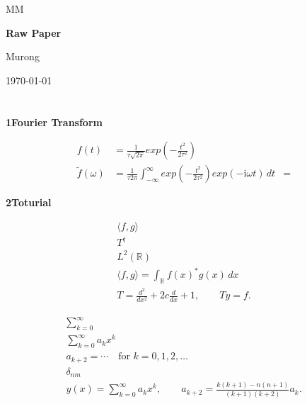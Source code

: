 \documentclass[12pt]{article}
\newcommand{\studentname}{Murong}
\newcommand{\coursename}{MM}
\newcommand{\sheetnumber}{Raw Paper}
\newcommand{\assignmenttitle}{}
\newcommand{\submissiondate}{\today}
\newcommand{\problem}[2]{%
    \par\vspace{1em}
    \noindent\textbf{#1\quad #2}
    \par\smallskip
}
\begin{document}
\begin{titlepage}
    \centering

    {\large \coursename\par}

    \vfill

    {\LARGE\bfseries \sheetnumber\par}

    \vspace{1cm}

    {\large \assignmenttitle\par}

    \vspace{1cm}

    {\large \studentname\par}

    \vspace{0.5cm}

    {\large \submissiondate\par}

    \vfill
\end{titlepage}

\pagebreak

\section*{\assignmenttitle}

\problem{1}{Fourier Transform}
\begin{align}
    f(t) &= \frac{1}{\tau \sqrt{2 \pi}} exp\left(-\frac{t^2}{2 \tau^2}\right) \\
    \tilde{f}(\omega) &= \frac{1}{\tau 2 \pi} \int_{-\infty}^{\infty} exp \left(-\frac{t^2}{2 \tau^2}\right) exp(-\mathrm{i} \omega t)\, dt
    &= 
\end{align}

\problem{2}{Toturial}
\begin{equation}
    \begin{gathered}
      \langle f,g\rangle \\
      T^\dagger \\
      L^2(\mathbb{R}) \\
      \langle f,g  \rangle = \int_{\mathbb{R}} f(x)^*g(x)\,dx \\
      T = \frac{d^2}{dx^2} + 2c\frac{d}{dx} + 1, \qquad Ty=f.
    \end{gathered}
\end{equation}

\begin{equation}
    \begin{gathered}
        \sum_{k=0}^{\infty} \\
        \sum_{k=0}^{\infty} a_k x^k \\
        a_{k+2} = \cdots
        \quad \text{for } k=0,1,2,\ldots\\
        \delta_{nm} \\
        y(x) = \sum_{k=0}^{\infty} a_k x^k,
        \qquad
        a_{k+2} = \frac{k(k+1)-n(n+1)}{(k+1)(k+2)}a_k.
    \end{gathered}
\end{equation}
\end{document}
